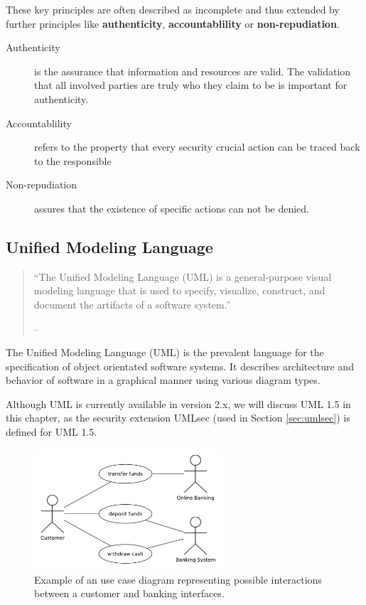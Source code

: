 \documentclass{acmtog} %
\begin{document}
These key principles are often described as incomplete and thus extended by further principles like \textbf{authenticity}, \textbf{accountablility} or \textbf{non-repudiation}.

\begin{description}
	\item[Authenticity] is the assurance that information and resources are valid.
		The validation that all involved parties are truly who they claim to be is important for authenticity.
	\item[Accountablility]
		refers to the property that every security crucial action can be traced back to the responsible
	\item[Non-repudiation]
		assures that the existence of specific actions can not be denied.
\end{description}

\subsection{Unified Modeling Language}

\begin{quote}
	``The Unified Modeling Language (UML) is a general-purpose visual modeling language that is used to specify, visualize, construct, and document the artifacts of a software system.''

	\hfill -- \cite[Chapter 1]{BJR99}
\end{quote}

The Unified Modeling Language (UML) is the prevalent language for the specification of object orientated software systems.
It describes architecture and behavior of software in a graphical manner using various diagram types.

Although UML is currently available in version 2.x, we will discuss UML 1.5 in this chapter, as the security extension UMLsec (used in Section \ref{sec:umlsec}) is defined for UML 1.5.

\begin{figure}[ht]
\centerline{\includegraphics[width=7cm]{img/uml-banking/use-case-diagram}}
\caption{Example of an use case diagram representing possible interactions between a customer and banking interfaces.}
    \label{fig:use-case-diagram}
\end{figure}
\end{document}
